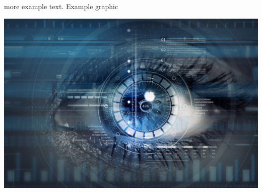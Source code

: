 \documentclass[openright]{report}
\begin{document}
\par more example text\cite{ibrahiminterview}. Example graphic

\begin{center}
    \includegraphics[scale=1]{images/cyber.jpg}
\end{center}






\listoffigures
\cleardoublepage
\end{document}
